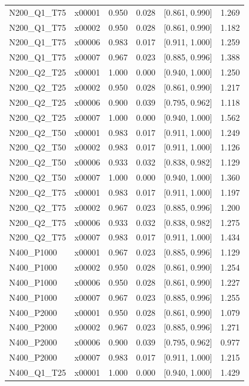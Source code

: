\begin{longtable}{lrrrrr}
N200\_Q1\_T75 & x00001 & 0.950 & 0.028 & [0.861, 0.990] & 1.269 \\
N200\_Q1\_T75 & x00002 & 0.950 & 0.028 & [0.861, 0.990] & 1.182 \\
N200\_Q1\_T75 & x00006 & 0.983 & 0.017 & [0.911, 1.000] & 1.259 \\
N200\_Q1\_T75 & x00007 & 0.967 & 0.023 & [0.885, 0.996] & 1.388 \\
N200\_Q2\_T25 & x00001 & 1.000 & 0.000 & [0.940, 1.000] & 1.250 \\
N200\_Q2\_T25 & x00002 & 0.950 & 0.028 & [0.861, 0.990] & 1.217 \\
N200\_Q2\_T25 & x00006 & 0.900 & 0.039 & [0.795, 0.962] & 1.118 \\
N200\_Q2\_T25 & x00007 & 1.000 & 0.000 & [0.940, 1.000] & 1.562 \\
N200\_Q2\_T50 & x00001 & 0.983 & 0.017 & [0.911, 1.000] & 1.249 \\
N200\_Q2\_T50 & x00002 & 0.983 & 0.017 & [0.911, 1.000] & 1.126 \\
N200\_Q2\_T50 & x00006 & 0.933 & 0.032 & [0.838, 0.982] & 1.129 \\
N200\_Q2\_T50 & x00007 & 1.000 & 0.000 & [0.940, 1.000] & 1.360 \\
N200\_Q2\_T75 & x00001 & 0.983 & 0.017 & [0.911, 1.000] & 1.197 \\
N200\_Q2\_T75 & x00002 & 0.967 & 0.023 & [0.885, 0.996] & 1.200 \\
N200\_Q2\_T75 & x00006 & 0.933 & 0.032 & [0.838, 0.982] & 1.275 \\
N200\_Q2\_T75 & x00007 & 0.983 & 0.017 & [0.911, 1.000] & 1.434 \\
N400\_P1000 & x00001 & 0.967 & 0.023 & [0.885, 0.996] & 1.129 \\
N400\_P1000 & x00002 & 0.950 & 0.028 & [0.861, 0.990] & 1.254 \\
N400\_P1000 & x00006 & 0.950 & 0.028 & [0.861, 0.990] & 1.227 \\
N400\_P1000 & x00007 & 0.967 & 0.023 & [0.885, 0.996] & 1.255 \\
N400\_P2000 & x00001 & 0.950 & 0.028 & [0.861, 0.990] & 1.079 \\
N400\_P2000 & x00002 & 0.967 & 0.023 & [0.885, 0.996] & 1.271 \\
N400\_P2000 & x00006 & 0.900 & 0.039 & [0.795, 0.962] & 0.977 \\
N400\_P2000 & x00007 & 0.983 & 0.017 & [0.911, 1.000] & 1.215 \\
N400\_Q1\_T25 & x00001 & 1.000 & 0.000 & [0.940, 1.000] & 1.429 \\

\end{longtable}
